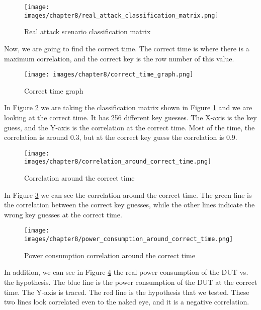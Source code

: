 \begin{figure}[!ht]
    \centering
    \texttt{[image: images/chapter8/real\_attack\_classification\_matrix.png]}
    \caption{Real attack scenario classification matrix} \label{c8_Matlab_classification_matrix:fig}
\end{figure}

Now, we are going to find the correct time. The correct time is where there is a
maximum correlation, and the correct key is the row number of this value.  

\begin{figure}[!ht]
    \centering
    \texttt{[image: images/chapter8/correct\_time\_graph.png]}
    \caption{Correct time graph} \label{c8_Matlab_correct_time:fig}
\end{figure}

In Figure \ref{c8_Matlab_correct_time:fig} we are taking the classification
matrix shown in Figure \ref{c8_Matlab_classification_matrix:fig}  and we are looking at
the correct time. It has 256 different key guesses. The X-axis is the key guess, and the Y-axis is the correlation at the correct time. Most of the time, the
correlation is around 0.3, but at the correct key guess the correlation is 0.9.  

\begin{figure}[!ht]
    \centering
    \texttt{[image: images/chapter8/correlation\_around\_correct\_time.png]}
    \caption{Correlation around the correct time} \label{c8_Matlab_correlation_around_the_correct_time:fig}
\end{figure}

In Figure \ref{c8_Matlab_correlation_around_the_correct_time:fig} we can see the
correlation around the correct time. The green line is the correlation between the
correct key guesses, while the other lines indicate the wrong key
guesses at the correct time.

\begin{figure}[!ht]
    \centering
    \texttt{[image: images/chapter8/power\_consumption\_around\_correct\_time.png]}
    \caption{Power consumption correlation around the correct time} \label{c8_Matlab_power_consumption_correlation_around_the_correct_time:fig}
\end{figure}

In addition, we can see in Figure
\ref{c8_Matlab_power_consumption_correlation_around_the_correct_time:fig} the
real power consumption of the DUT vs. the hypothesis. The blue line is the power
consumption of the DUT at the correct time. The Y-axis is traced. The red line
is the hypothesis that we tested. These two lines look correlated even to the naked
eye, and it is a negative correlation.

